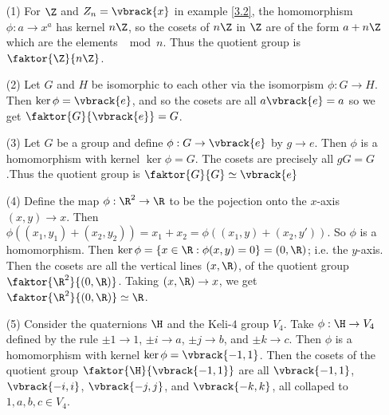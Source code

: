 \begin{example}\label{3.2}
    \begin{enumerate}
        \item[(1)] For $\Z$ and  $Z_n=\vbrack{x}$ in example \ref {3.2}, the
            homomorphism $\phi:a \rightarrow x^a$ has kernel $n\Z$, so the
            cosets of  $n\Z$ in  $\Z$ are of the form  $a+n\Z$ which are the
            elements $\mod{n}$. Thus the quotient group is $\faktor{\Z}{n\Z}$.

        \item[(2)] Let $G$ and  $H$ be isomorphic to each other via the
            isomorpism  $\phi:G \rightarrow H$. Then $\ker{\phi}=\vbrack{e}$,
            and so the cosets are all $a\vbrack{e}=a$ so we get
            $\faktor{G}{\vbrack{e}}=G$.

        \item[(3)] Let $G$ be a group and define  $\phi:G \rightarrow
            \vbrack{e}$ by $g \rightarrow e$. Then $\phi$ is a homomorphism with
             kernel $\ker{\phi}=G$. The cosets are precisely all $gG=G$.Thus
             the quotient group is $\faktor{G}{G} \simeq \vbrack{e}$

         \item[(4)] Define the map $\phi:\R^2 \rightarrow \R$ to be the
             pojection onto the $x$-axis $(x,y) \rightarrow x$. Then
             $\phi((x_1,y_1)+(x_2,y_2))=x_1+x_2=\phi((x_1,y)+(x_2,y'))$. So
             $\phi$ is a homomorphism. Then $\ker{\phi}=\{x \in \R :
             \phi(x,y)=0\}=(0,\R)$; i.e. the $y$-axis. Then the cosets are all
             the vertical lines $(x,\R)$, of the quotient group
             $\faktor{\R^2}{(0,\R)}$. Taking $(x,\R) \rightarrow x$, we get
             $\faktor{\R^2}{(0,\R)} \simeq \R$.

         \item[(5)] Consider the quaternions $\H$ and the Keli-$4$ group  $V_4$.
             Take  $\phi:\H \rightarrow V_4$ defined by the rule $\pm 1
             \rightarrow 1$, $\pm i \rightarrow a$, $\pm j \rightarrow b$, and
              $\pm k \rightarrow c$. Then  $\phi$ is a homomorphism with kernel
               $\ker{\phi}=\vbrack{-1,1}$. Then the cosets of the quotient group
                $\faktor{\H}{\vbrack{-1,1}}$ are all $\vbrack{-1,1}$,
                $\vbrack{-i,i}$, $\vbrack{-j,j}$, and $\vbrack{-k,k}$, all
                collaped to  $1,a,b,c \in V_4$.
    \end{enumerate}
\end{example}
